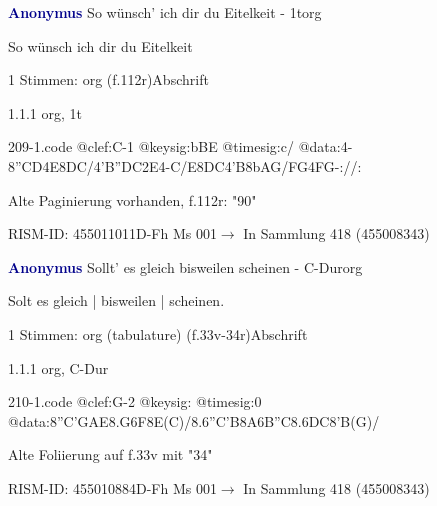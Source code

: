 \documentclass[twocolumn, 12pt]{book}
\begin{document}
\par \vspace{16pt} \textcolor{darkblue}{\textbf{Anonymus  }}\hfillplus{\textbf{[209]}}\newline So wünsch' ich dir du Eitelkeit - 1t\newline org
\par \begin{itshape}[f.112r, heading:] So wünsch ich dir du Eitelkeit\end{itshape} 
\par \textcolor{darkblue}{}  1 Stimmen: org  (f.112r)\newline Abschrift
\par 1.1.1  org, 1t  
\begin{filecontents*}{209-1.code}
@clef:C-1
@keysig:bBE
@timesig:c/
@data:4-{8''CD}4E{8DC}/4'B''DC2E4-C/E{8DC}4'B{8bAG}/{FG}4FG-://:
\end{filecontents*}
\newline %
\par Alte Paginierung vorhanden, f.112r: "90"
\par RISM-ID: 455011011\newline D-Fh  Ms 001\newline $\rightarrow$ In Sammlung 418 (455008343)
      
\par \vspace{16pt} \textcolor{darkblue}{\textbf{Anonymus  }}\hfillplus{\textbf{[210]}}\newline Sollt' es gleich bisweilen scheinen - C-Dur\newline org
\par \begin{itshape}[f.33v, at left:] Solt es gleich | bisweilen | scheinen.\end{itshape} 
\par \textcolor{darkblue}{}  1 Stimmen: org (tabulature)  (f.33v-34r)\newline Abschrift
\par 1.1.1  org, C-Dur  
\begin{filecontents*}{210-1.code}
@clef:G-2
@keysig:
@timesig:0
@data:{8''C'GAE}{8.G6F8E(C)}/{8.6''C'B8A6B''C}{8.6DC8'B(G)}/
\end{filecontents*}
\newline %
\par Alte Foliierung auf f.33v mit "34"
\par RISM-ID: 455010884\newline D-Fh  Ms 001\newline $\rightarrow$ In Sammlung 418 (455008343)
      
\end{document}
